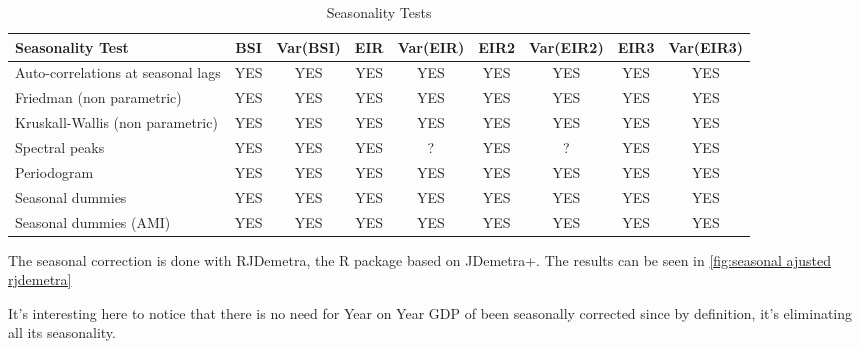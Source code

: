 \documentclass[12pt,a4paper,oneside]{book}
\begin{document}
\begin{table}[htp!]
    \centering \footnotesize
    \begin{tabular}{l|c|c|c|c|c|c|c|c}
\textbf{Seasonality Test} & BSI & Var(BSI) & EIR & Var(EIR) & EIR2 & Var(EIR2) & EIR3 & Var(EIR3) \\ \hline
Auto-correlations at seasonal lags& YES & YES & YES & YES & YES & YES & YES & YES \\
Friedman (non parametric)       & YES   & YES & YES & YES & YES & YES & YES & YES \\
Kruskall-Wallis (non parametric)& YES   & YES & YES & YES & YES & YES & YES & YES \\
Spectral peaks                  & YES   & YES & YES & ? & YES & ? & YES & YES \\
Periodogram                     & YES   & YES & YES & YES & YES & YES & YES & YES \\
Seasonal dummies                & YES   & YES & YES & YES & YES & YES & YES & YES \\
Seasonal dummies (AMI)          & YES   & YES & YES & YES & YES & YES & YES & YES \\
    \end{tabular}
    \caption{Seasonality Tests}
    \label{tab:Seasonality Tests}
\end{table}{}


The seasonal correction is done with RJDemetra, the R package based on JDemetra+.
The results can be seen in \autoref{fig:seasonal ajusted rjdemetra}

It's interesting here to notice that there is no need for Year on Year GDP of been seasonally corrected since by definition, it's eliminating all its seasonality.
\end{document}

